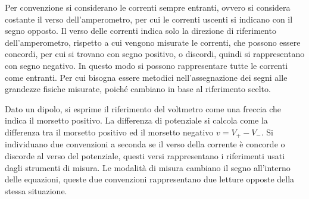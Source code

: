\documentclass{article}
\numberwithin{equation}{subsection}
\begin{document}
Per convenzione si considerano le correnti sempre entranti, ovvero si considera costante il verso dell'amperometro, per cui le correnti uscenti si indicano con il segno 
opposto. Il verso delle correnti indica solo la direzione di riferimento dell'amperometro, rispetto a cui vengono misurate le correnti, che possono essere concordi, per cui 
si trovano con segno positivo, o discordi, quindi si rappresentano con segno negativo. In questo modo si possono rappresentare tutte le correnti come entranti. Per cui bisogna 
essere metodici nell'assegnazione dei segni alle grandezze fisiche misurate, poiché cambiano in base al riferimento scelto. 

\begin{center}
\end{center}

Dato un dipolo, si esprime il riferimento del voltmetro come una freccia che indica il morsetto positivo. La differenza di potenziale si calcola come la differenza tra il 
morsetto positivo ed il morsetto negativo $v=V_+-V_-$. Si individuano due convenzioni a seconda se il verso della corrente è concorde o discorde al verso del potenziale, questi 
versi rappresentano i riferimenti usati dagli strumenti di misura. Le modalità di misura cambiano il segno all'interno delle equazioni, queste due convenzioni rappresentano 
due letture opposte della stessa situazione. 

\begin{center}
\end{center}
\end{document}
